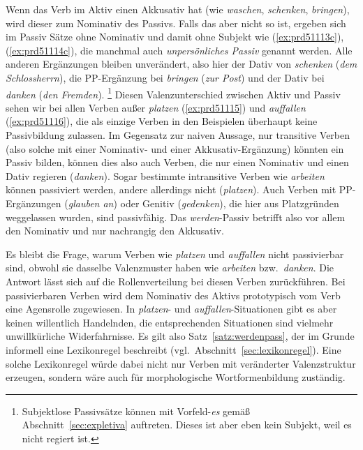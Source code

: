Wenn das Verb im Aktiv einen Akkusativ hat (wie \textit{waschen}, \textit{schenken}, \textit{bringen}), wird dieser zum Nominativ des Passivs.
Falls das aber nicht so ist, ergeben sich im Passiv Sätze ohne Nominativ und damit ohne Subjekt wie (\ref{ex:prd51113c}), (\ref{ex:prd51114c}), die manchmal auch \textit{unpersönliches Passiv} genannt werden.
Alle anderen Ergänzungen bleiben unverändert, also hier der Dativ von \textit{schenken} (\textit{dem Schlossherrn}), die PP-Ergänzung bei \textit{bringen} (\textit{zur Post}) und der Dativ bei \textit{danken} (\textit{den Fremden}).%
\footnote{Subjektlose Passivsätze können mit Vorfeld-\textit{es} gemäß Abschnitt~\ref{sec:expletiva} auftreten.
Dieses ist aber eben kein Subjekt, weil es nicht regiert ist.}
Diesen Valenzunterschied zwischen Aktiv und Passiv sehen wir bei allen Verben außer \textit{platzen} (\ref{ex:prd51115}) und \textit{auffallen} (\ref{ex:prd51116}), die als einzige Verben in den Beispielen überhaupt keine Passivbildung zulassen.
Im Gegensatz zur naiven Aussage, nur transitive Verben (also solche mit einer Nominativ- und einer Akkusativ-Ergänzung) könnten ein Passiv bilden, können dies also \zB auch Verben, die nur einen Nominativ und einen Dativ regieren (\textit{danken}).
Sogar bestimmte intransitive Verben wie \textit{arbeiten} können passiviert werden, andere allerdings nicht (\textit{platzen}).
Auch Verben mit PP-Ergänzungen (\textit{glauben an}) oder Genitiv (\textit{gedenken}), die hier aus Platzgründen weggelassen wurden, sind passivfähig.
Das \textit{werden}-Passiv betrifft also vor allem den Nominativ und nur nachrangig den Akkusativ.

Es bleibt die Frage, warum Verben wie \textit{platzen} und \textit{auffallen} nicht passivierbar sind, obwohl sie dasselbe Valenzmuster haben wie \textit{arbeiten} bzw.\ \textit{danken}.
Die Antwort lässt sich auf die Rollenverteilung bei diesen Verben zurückführen.
Bei passivierbaren Verben wird dem Nominativ des Aktivs prototypisch vom Verb eine Agensrolle zugewiesen.
In \textit{platzen}- und \textit{auffallen}-Situationen gibt es aber keinen willentlich Handelnden, die entsprechenden Situationen sind vielmehr unwillkürliche Widerfahrnisse.
Es gilt also Satz~\ref{satz:werdenpass}, der im Grunde informell eine Lexikonregel beschreibt (vgl.\ Abschnitt~\ref{sec:lexikonregel}).
Eine solche Lexikonregel würde dabei nicht nur Verben mit veränderter Valenzstruktur erzeugen, sondern wäre auch für morphologische Wortformenbildung zuständig.


